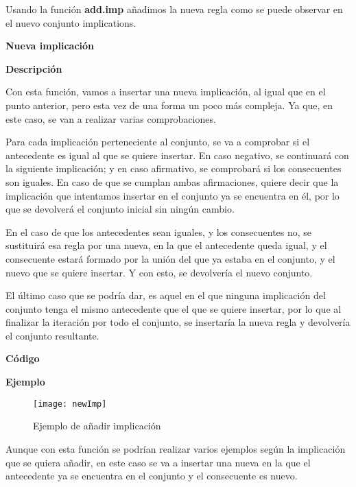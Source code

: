     Usando la funci\'on \textbf{add.imp} a\~nadimos la nueva regla como se puede observar en el nuevo conjunto implications.

    \clearpage


\textbf{ \large Nueva implicaci\'on}

\smallskip

    \textbf{Descripci\'on}

    Con esta funci\'on, vamos a insertar una nueva implicaci\'on, al igual que en el punto anterior, pero esta vez 
    de una forma un poco m\'as compleja. Ya que, en este caso, se van a realizar varias comprobaciones.

    Para cada implicaci\'on perteneciente al conjunto, se va a comprobar si el antecedente es igual al que se quiere insertar.
    En caso negativo, se continuar\'a con la siguiente implicaci\'on; y en caso afirmativo, se comprobar\'a si los consecuentes son 
    iguales. En caso de que se cumplan ambas afirmaciones, quiere decir que la implicaci\'on que intentamos insertar en el conjunto 
    ya se encuentra en \'el, por lo que se devolver\'a el conjunto inicial sin ning\'un cambio.

    En el caso de que los antecedentes sean iguales, y los consecuentes no, se sustituir\'a esa regla por una nueva, en la que el antecedente 
    queda igual, y el consecuente estar\'a formado por la uni\'on del que ya estaba en el conjunto, y el nuevo que se quiere insertar. Y con 
    esto, se devolver\'ia el nuevo conjunto.

    El \'ultimo caso que se podr\'ia dar, es aquel en el que ninguna implicaci\'on del conjunto tenga el mismo antecedente que el que se 
    quiere insertar, por lo que al finalizar la iteraci\'on por todo el conjunto, se insertar\'ia la nueva regla y devolver\'ia el conjunto 
    resultante.
    \\

    \clearpage

    \textbf{C\'odigo}

    
    \bigskip

    \textbf{Ejemplo}


    \begin{figure}[H]
        \centering
        \texttt{[image: newImp]}
        \caption{Ejemplo de a\~nadir implicaci\'on}
        \label{fig:newImp}
    \end{figure}

    Aunque con esta funci\'on se podr\'ian realizar varios ejemplos seg\'un la implicaci\'on que se quiera a\~nadir, en este caso se 
    va a insertar una nueva en la que el antecedente ya se encuentra en el conjunto y el consecuente es nuevo.

